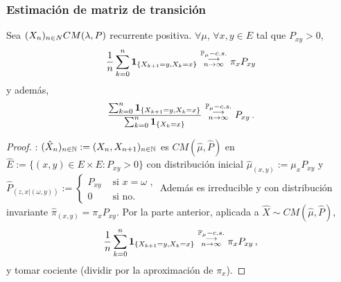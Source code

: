 \subsubsection{Estimación de matriz de transición}
\begin{corolary}
Sea $\xcm \cm$ recurrente positiva. $\forall \mu$, $\forall x,y\in E$ tal que $P_{xy}>0$,
$$ \displaystyle\frac{1}{n}\sum^n_{k=0}\mathbf{1}_{\{X_{k+1}=y,X_k=x\}} \mbox{ }\overset{\P_\mu-c.s.}{\substack{\longrightarrow \\n \to \infty}}\mbox{ }\pi_xP_{xy}$$
y además,
$$ \displaystyle \frac{\sum^n_{k=0}\mathbf{1}_{\{X_{k+1}=y,X_k=x\}}}{\sum^n_{k=0}\mathbf{1}_{\{X_{k}=x\}}}\mbox{ }\overset{\P_\mu-c.s.}{\substack{\longrightarrow \\n \to \infty}}\mbox{ }P_{xy}\,.$$
\end{corolary}
\begin{proof}
\ejercicio \gris: \newline $(\hat{X}_n)_{n\in\N}:=(X_n,X_{n+1})_{n\in\N}$ es $CM(\hat{\mu},\hat{P})$ en $\hat{E}:=\{(x,y)\in E\times E:P_{xy}>0\}$ con distribución inicial $\hat{\mu}_{(x,y)}:=\mu_xP_{xy}$ y $\hat{P}_{(z,x|(\omega,y))}:=\begin{cases}
P_{xy}
& \mbox{ si }x=\omega \mbox{ ,}\\
0 & \mbox{ si no.}
\end{cases}$ \newline Además es irreducible y con distribución invariante $\hat{\pi}_{(x,y)}=\pi_xP_{xy}$.
\newline Por la parte anterior, aplicada a $\hat{X}\sim CM(\hat{\mu},\hat{P})$,
$$ \displaystyle\frac{1}{n}\sum^n_{k=0}\mathbf{1}_{\{X_{k+1}=y,X_k=x\}} \mbox{ }\overset{\P_\mu-c.s.}{\substack{\longrightarrow \\n \to \infty}}\mbox{ }\pi_xP_{xy} \, ,$$ y tomar cociente (dividir por la aproximación de $\pi_x$). \negro \findem
\end{proof}
\vspace{1.5cm}\\
